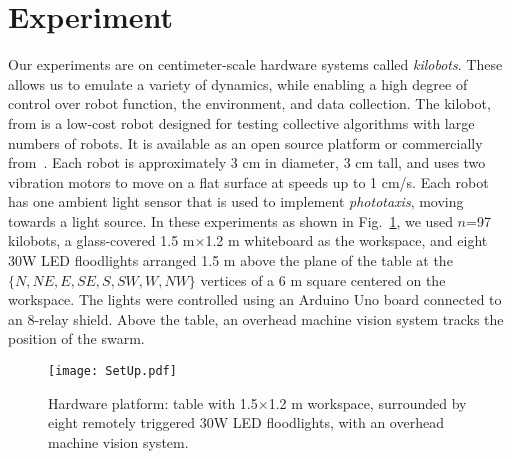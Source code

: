 
\section{Experiment}\label{sec:expResults}





Our experiments are on centimeter-scale hardware systems called \emph{kilobots}.  These allows us to emulate a variety of dynamics, while enabling a high degree of control over robot function, the environment, and data collection. The kilobot, from \cite{Rubenstein2012,rubenstein2014programmable} is a low-cost robot designed for testing collective algorithms with large numbers of robots. It is available as an open source platform or commercially from~\cite{K-Team2015}.  Each robot is approximately 3 cm in diameter, 3 cm tall, and uses two vibration motors to move on a flat surface at speeds up to 1 cm/s.  Each robot has one ambient light sensor that is used to implement \emph{phototaxis},  moving towards a light source. 
In these experiments as shown in Fig.~\ref{fig:setup}, we used $n$=97 kilobots, a glass-covered 1.5 m$\times$1.2 m whiteboard as the workspace, and eight 30W LED floodlights arranged 1.5 m above the plane of the table at the $\{N,NE,E,SE,S,SW,W,NW\}$ vertices of a 6 m square centered on the workspace. The lights were controlled using an Arduino Uno board connected to an 8-relay shield.  Above  the table, an overhead machine vision system tracks the position of the swarm.


\begin{figure}
\begin{center}
	\texttt{[image: SetUp.pdf]}
\end{center}
\vspace{-1em}
\caption{\label{fig:setup}
Hardware platform:  table with 1.5$\times$1.2 m workspace, surrounded by eight remotely triggered 30W LED floodlights, with an overhead machine vision system.
}
\vspace{-1.5em}
\end{figure}

